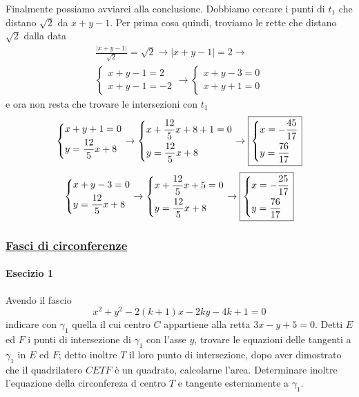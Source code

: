 Finalmente possiamo avviarci alla conclusione. Dobbiamo cercare i punti di $t_1$ che distano 
$\sqrt{2}$ da $x+y-1$. Per prima cosa quindi, troviamo le rette che distano $\sqrt{2}$ dalla data
\begin{align*}
\frac{\lvert x+y-1\rvert}{\sqrt{2}} = \sqrt{2} \rightarrow \lvert x+y-1\rvert = 2 \rightarrow\\
\begin{cases}
x+y-1=2\\
x+y-1=-2
\end{cases} \rightarrow
\begin{cases}
x+y-3=0\\
x+y+1=0
\end{cases}
\end{align*}
e ora non resta che trovare le intersezioni con $t_1$
\begin{equation*}
\begin{dcases}
x+y+1=0\\
y=\frac{12}{5}x+8
\end{dcases}\rightarrow
\begin{dcases}
x+\frac{12}{5}x+8+1=0\\
y=\frac{12}{5}x+8
\end{dcases}\rightarrow
\boxed{\begin{dcases}
x = -\frac{45}{17}\\
y = \frac{76}{17}
\end{dcases}}
\end{equation*}
\begin{equation*}
\begin{dcases}
x+y-3=0\\
y=\frac{12}{5}x+8
\end{dcases}\rightarrow
\begin{dcases}
x+\frac{12}{5}x+5=0\\
y=\frac{12}{5}x+8
\end{dcases}\rightarrow
\boxed{\begin{dcases}
x = -\frac{25}{17}\\
y = \frac{76}{17}
\end{dcases}}
\end{equation*}

\subsubsection*{\hyperref[subsec:geomanal:fasciocirc]{Fasci di circonferenze}}
\paragraph{Esecizio 1}
Avendo il fascio
\begin{equation*}
x^2+y^2-2(k+1)x-2ky-4k+1=0
\end{equation*}
indicare con $\gamma_1$ quella il cui centro $C$ appartiene
alla retta $3x-y+5=0$. Detti $E$ ed $F$ i punti di intersezione di $\gamma_1$ con l'asse $y$, trovare
le equazioni delle tangenti a $\gamma_1$ in $E$ ed $F$; detto inoltre $T$ il loro punto di 
intersezione, dopo aver dimostrato che il quadrilatero $CETF$ è un quadrato, calcolarne l'area. 
Determinare inoltre l'equazione della circonfereza d centro $T$ e tangente esternamente a $\gamma_1$.
\divisor


